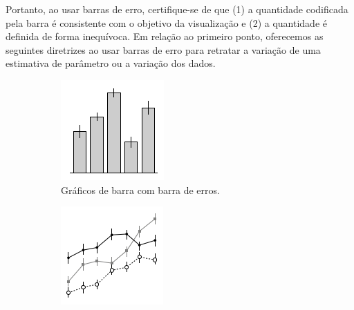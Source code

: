 \documentclass[article]{memoir}
\begin{document}
Portanto, ao usar barras de erro, certifique-se de que (1) a quantidade codificada pela barra é consistente com o objetivo da visualização e (2) a quantidade é definida de forma inequívoca. Em relação ao primeiro ponto, oferecemos as seguintes diretrizes ao usar barras de erro para retratar a variação de uma estimativa de parâmetro ou a variação dos dados.
\begin{figure}[ht]
	\centering
	\begin{minipage}{0.7\textwidth} %
		\begin{subfigure}[b]{0.45\textwidth}
			\centering
			\includegraphics[width=\textwidth]{figs/error_bar_example}
			\caption{Gráficos de barra com barra de erros.}
			\label{fig:sub1}
		\end{subfigure}
		\hfill
		\begin{subfigure}[b]{0.45\textwidth}
			\centering
			\includegraphics[width=\textwidth]{figs/error_line_example}

\end{subfigure}
\end{minipage}
\end{figure}
\end{document}
